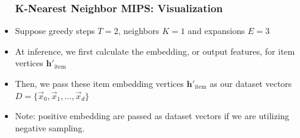 \documentclass{beamer}
\begin{document}
\begin{frame}[fragile]
\begin{itemize}
\frametitle{K-Nearest Neighbor MIPS: Visualization}

\item Suppose greedy steps $T = 2$, neighbors $K = 1$ and expansions $E = 3$

\vspace{0.4cm}

\begin{minipage}[c]{0.5\textwidth}
    \hspace{2.5cm}
    
\end{minipage}

\end{itemize}
\end{frame}


\begin{frame}[fragile]
\begin{itemize}
\frametitle{K-Nearest Neighbors MIPS: Code}

\item At inference, we first calculate the embedding, or output features, for item vertices $\mathbf{h'}_{\text{item}}$



\item Then, we pass these item embedding vertices $\mathbf{h'}_{\text{item}}$ as our dataset vectors $D = \{\overrightarrow{x}_{0}, \overrightarrow{x}_{1}, ..., \overrightarrow{x}_{d} \}$

\item Note: positive embedding are passed as dataset vectors if we are utilizing negative sampling. 

\end{itemize}
\end{frame}

\end{document}
